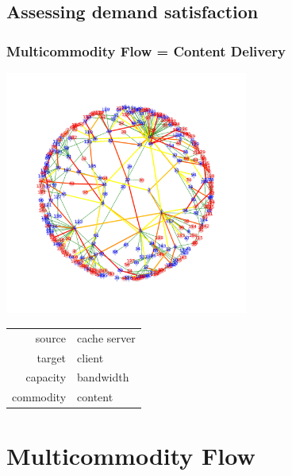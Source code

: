 \documentclass{beamer}
\begin{document}
\subsection{Assessing demand satisfaction}
\begin{frame}
    \frametitle{Multicommodity Flow = Content Delivery}

    \begin{center}
    \includegraphics[trim = 20mm 20mm 20mm 20mm, clip, width=0.6\textwidth]{earth.png}

        \begin{tabular}{r | l}
        source & cache server\\
        target & client\\ 
        capacity & bandwidth\\ 
        commodity & content\\
        \end{tabular}
    \end{center}

\end{frame}

\section{Multicommodity Flow}
\end{document}
